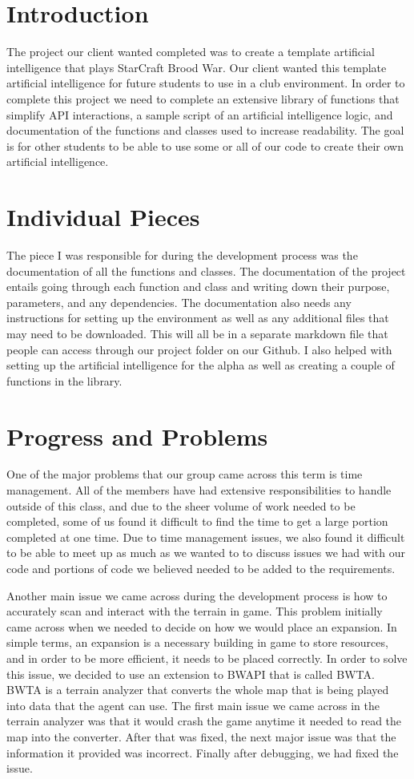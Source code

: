 \documentclass[10pt,letterpaper,onecolumn,draftclsnofoot]{IEEEtran}
\begin{document}
\section{Introduction}
The project our client wanted completed was to create a template artificial intelligence that plays StarCraft Brood War. Our client wanted this template artificial intelligence for future students to use in a club environment. In order to complete this project we need to complete an extensive library of functions that simplify API interactions, a sample script of an artificial intelligence logic, and documentation of the functions and classes used to increase readability. The goal is for other students to be able to use some or all of our code to create their own artificial intelligence.

\section{Individual Pieces}
The piece I was responsible for during the development process was the documentation of all the functions and classes. The documentation of the project entails going through each function and class and writing down their purpose, parameters, and any dependencies. The documentation also needs any instructions for setting up the environment as well as any additional files that may need to be downloaded. This will all be in a separate markdown file that people can access through our project folder on our Github. I also helped with setting up the artificial intelligence for the alpha as well as creating a couple of functions in the library.

\section{Progress and Problems}
One of the major problems that our group came across this term is time management. All of the members have had extensive responsibilities to handle outside of this class, and due to the sheer volume of work needed to be completed, some of us found it difficult to find the time to get a large portion completed at one time. Due to time management issues, we also found it difficult to be able to meet up as much as we wanted to to discuss issues we had with our code and portions of code we believed needed to be added to the requirements.

Another main issue we came across during the development process is how to accurately scan and interact with the terrain in game. This problem initially came across when we needed to decide on how we would place an expansion. In simple terms, an expansion is a necessary building in game to store resources, and in order to be more efficient, it needs to be placed correctly. In order to solve this issue, we decided to use an extension to BWAPI that is called BWTA. BWTA is a terrain analyzer that converts the whole map that is being played into data that the agent can use. The first main issue we came across in the terrain analyzer was that it would crash the game anytime it needed to read the map into the converter. After that was fixed, the next major issue was that the information it provided was incorrect. Finally after debugging, we had fixed the issue.
\end{document}
